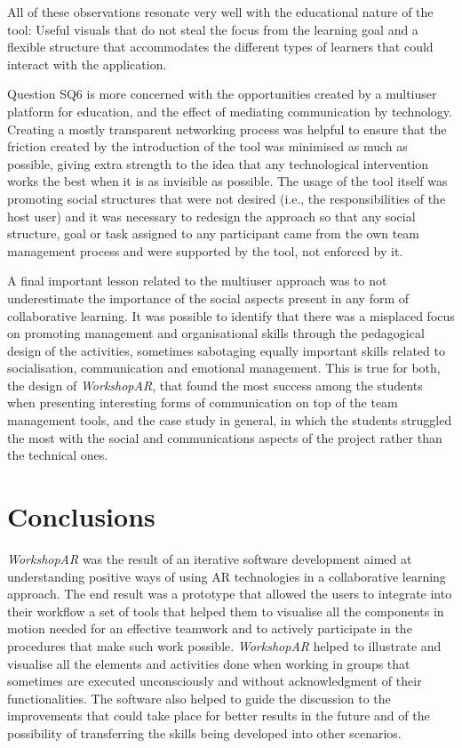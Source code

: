 All of these observations resonate very well with the educational nature of the tool: Useful visuals that do not steal the focus from the learning goal and a flexible structure that
accommodates the different types of learners that could interact with the application.

Question SQ6 is more concerned with the opportunities created by a multiuser platform for education, and the effect of mediating communication by technology. Creating a mostly transparent
networking process was helpful to ensure that the friction created by the introduction of the tool was minimised as much as possible, giving extra strength to the idea that any
technological intervention works the best when it is as invisible as possible. The usage of the tool itself was promoting social structures that were not desired (i.e., the responsibilities
of the host user) and it was necessary to redesign the approach so that any social structure, goal or task assigned to any participant came from the own team management process and were
supported by the tool, not enforced by it.

A final important lesson related to the multiuser approach was to not underestimate the importance of the social aspects present in any form of collaborative learning. It was possible to
identify that there was a misplaced focus on promoting management and organisational skills through the pedagogical design of the activities, sometimes sabotaging equally important skills
related to socialisation, communication and emotional management. This is true for both, the design of \emph{WorkshopAR}, that found the most success among the students when presenting
interesting forms of communication on top of the team management tools, and the case study in general, in which the students struggled the most with the social and communications aspects
of the project rather than the technical ones.

\section{Conclusions \label{sec:5-3}}

\emph{WorkshopAR} was the result of an iterative software development aimed at understanding positive ways of using \ac{AR} technologies in a collaborative learning approach. The end
result was a prototype that allowed the users to integrate into their workflow a set of tools that helped them to visualise all the components in motion needed for an effective teamwork
and to actively participate in the procedures that make such work possible. \emph{WorkshopAR} helped to illustrate and visualise all the elements and activities done when working in groups
that sometimes are executed unconsciously and without acknowledgment of their functionalities. The software also helped to guide the discussion to the improvements that could take place for
better results in the future and of the possibility of transferring the skills being developed into other scenarios.

